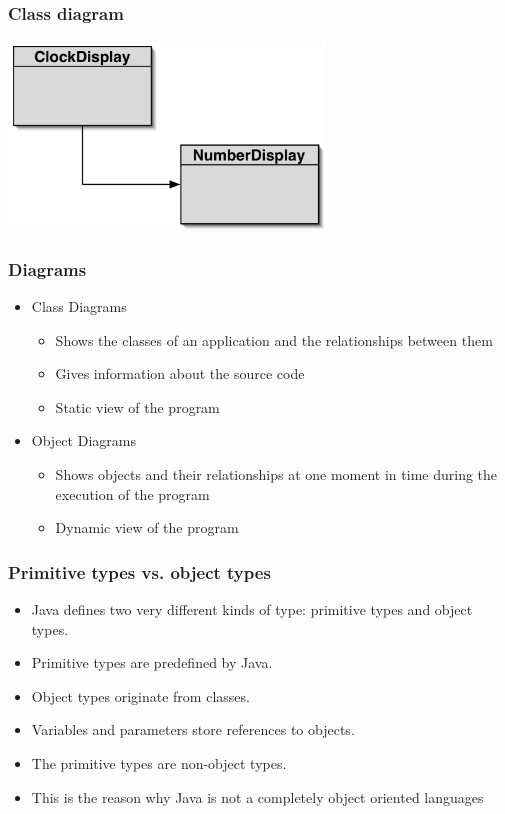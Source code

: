 \documentclass{beamer}
\begin{document}
\begin{frame}
\frametitle{Class diagram}
\begin{center}
\includegraphics[height=5cm, keepaspectratio]{./figures/class}
\end{center}
\end{frame}

\begin{frame}
\frametitle{Diagrams}
\begin{itemize}
\item Class Diagrams
\begin{itemize}
\item Shows the classes of an application and the relationships between them
\item Gives information about the source code
\item Static view of the program
\end{itemize}
\item Object Diagrams
\begin{itemize}
\item Shows objects and their relationships at one moment in time during the execution of the program
\item Dynamic view of the program
\end{itemize}
\end{itemize}
\end{frame}

\begin{frame}
\frametitle{Primitive types vs. object types}
\begin{itemize}
\item Java defines two very different kinds of type: primitive types and object types.
\item Primitive types are predefined by Java.
\item Object types originate from classes.
\item Variables and parameters store references to objects.
\item The primitive types are non-object types.
\item This is the reason why Java is not a completely object oriented languages
\end{itemize}
\end{frame}
\end{document}
